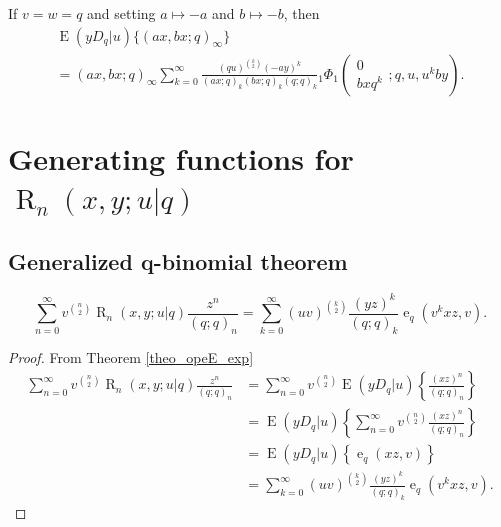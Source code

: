 \documentclass{cimart}
\DeclareMathOperator{\ope}{e}
\DeclareMathOperator{\opE}{E}
\DeclareMathOperator{\opR}{R}
\begin{document}
\begin{corollary}\label{coro4}
If $v=w=q$ and setting $a\mapsto-a$ and $b\mapsto-b$, then
    \begin{multline}
        \opE(yD_{q}|u)\{(ax,bx;q)_{\infty}\}\\
        =(ax,bx;q)_{\infty}\sum_{k=0}^{\infty}\frac{(qu)^{\binom{k}{2}}(-ay)^k}{(ax;q)_{k}(bx;q)_{k}(q;q)_{k}}{}_{1}\Phi_{1}\left(
        \begin{array}{c}
             0 \\
             bxq^k
        \end{array};
        q,u,u^kby
        \right).
    \end{multline}
\end{corollary}
\section{Generating functions for \texorpdfstring{$\opR_{n}(x,y;u|q)$}{r\_n(x,y;u|q)}}

\subsection{Generalized q-binomial theorem}

\begin{theorem}\label{theo_v_gen_func}
    \begin{equation}
        \sum_{n=0}^{\infty}v^{\binom{n}{2}}\opR_{n}(x,y;u|q)\frac{z^n}{(q;q)_{n}}=\sum_{k=0}^{\infty}\left(uv\right)^{\binom{k}{2}}\frac{(yz)^k}{(q;q)_{k}}\ope_{q}\left(v^{k}xz,v\right).
    \end{equation}
\end{theorem}
\begin{proof}
From Theorem \ref{theo_opeE_exp}
    \begin{align*}
        \sum_{n=0}^{\infty}v^{\binom{n}{2}}\opR_{n}(x,y;u|q)\frac{z^n}{(q;q)_{n}}&=\sum_{n=0}^{\infty}v^{\binom{n}{2}}\opE(yD_{q}|u)\left\{\frac{(xz)^n}{(q;q)_{n}}\right\}\\
        &=\opE(yD_{q}|u)\left\{\sum_{n=0}^{\infty}v^{\binom{n}{2}}\frac{(xz)^n}{(q;q)_{n}}\right\}\\
        &=\opE(yD_{q}|u)\left\{\ope_{q}(xz,v)\right\}\\
        &=\sum_{k=0}^{\infty}\left(uv\right)^{\binom{k}{2}}\frac{(yz)^k}{(q;q)_{k}}\ope_{q}\left(v^{k}xz,v\right).
    \end{align*}
\end{proof}
\end{document}
